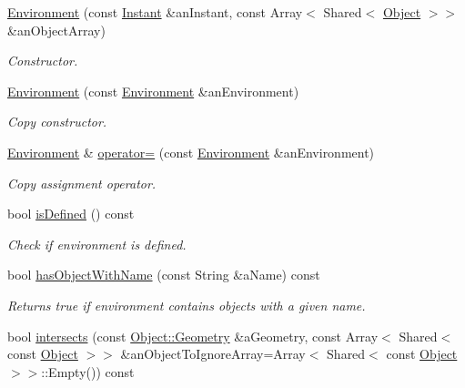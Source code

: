\begin{DoxyCompactItemize}
\item 
\hyperlink{classostk_1_1physics_1_1_environment_a9c721c6c5eba3608b2225922ab498c95}{Environment} (const \hyperlink{classostk_1_1physics_1_1time_1_1_instant}{Instant} \&an\+Instant, const Array$<$ Shared$<$ \hyperlink{classostk_1_1physics_1_1env_1_1_object}{Object} $>$$>$ \&an\+Object\+Array)
\begin{DoxyCompactList}\small\item\em Constructor. \end{DoxyCompactList}\item 
\hyperlink{classostk_1_1physics_1_1_environment_ae2fa360cd4bd59f8af1b6c7874be3e2c}{Environment} (const \hyperlink{classostk_1_1physics_1_1_environment}{Environment} \&an\+Environment)
\begin{DoxyCompactList}\small\item\em Copy constructor. \end{DoxyCompactList}\item 
\hyperlink{classostk_1_1physics_1_1_environment}{Environment} \& \hyperlink{classostk_1_1physics_1_1_environment_ac0ddef2496b987f9780df94c9ec49990}{operator=} (const \hyperlink{classostk_1_1physics_1_1_environment}{Environment} \&an\+Environment)
\begin{DoxyCompactList}\small\item\em Copy assignment operator. \end{DoxyCompactList}\item 
bool \hyperlink{classostk_1_1physics_1_1_environment_ac597f4d54313d272bc24f62a9f2c0f5c}{is\+Defined} () const
\begin{DoxyCompactList}\small\item\em Check if environment is defined. \end{DoxyCompactList}\item 
bool \hyperlink{classostk_1_1physics_1_1_environment_af83819fdcd1586e185ce21e92ce574ed}{has\+Object\+With\+Name} (const String \&a\+Name) const
\begin{DoxyCompactList}\small\item\em Returns true if environment contains objects with a given name. \end{DoxyCompactList}\item 
bool \hyperlink{classostk_1_1physics_1_1_environment_a9a720fa8e7f4b2a30721280a0081716c}{intersects} (const \hyperlink{classostk_1_1physics_1_1env_1_1_object_a66e44a65aefb23a184a6de531e96935d}{Object\+::\+Geometry} \&a\+Geometry, const Array$<$ Shared$<$ const \hyperlink{classostk_1_1physics_1_1env_1_1_object}{Object} $>$$>$ \&an\+Object\+To\+Ignore\+Array=Array$<$ Shared$<$ const \hyperlink{classostk_1_1physics_1_1env_1_1_object}{Object} $>$$>$\+::Empty()) const
$$
\end{DoxyCompactItemize}
